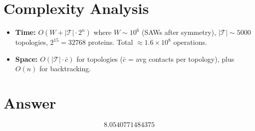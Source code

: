 \documentclass[12pt]{article}
\begin{document}
\section{Complexity Analysis}
\begin{itemize}
\item \textbf{Time:} $O(W + |\mathcal{T}| \cdot 2^n)$ where $W \sim 10^6$ (SAWs after symmetry), $|\mathcal{T}| \sim 5000$ topologies, $2^{15} = 32768$ proteins. Total $\approx 1.6 \times 10^8$ operations.
\item \textbf{Space:} $O(|\mathcal{T}| \cdot \bar{c})$ for topologies ($\bar{c}$ = avg contacts per topology), plus $O(n)$ for backtracking.
\end{itemize}

\section{Answer}

\[
\boxed{8.0540771484375}
\]
\end{document}
